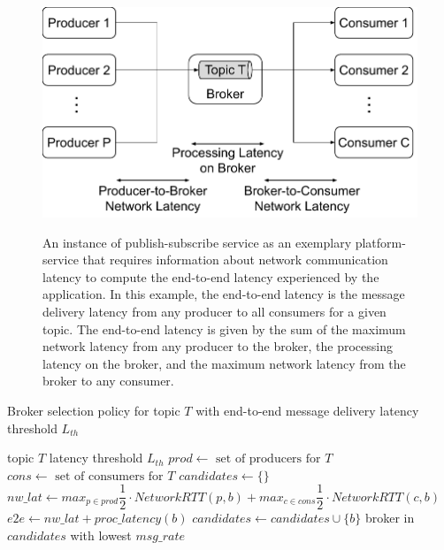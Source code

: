 \begin{figure}
\centering
\includegraphics[width=0.6\linewidth]{figures/mechanisms/nw_proximity/pubsub_e2e_latency.pdf}
\label{fig:nw_proximity_pubsub_e2e_latency}
\caption{An instance of publish-subscribe service as an exemplary platform-service that requires information about network communication latency to compute the end-to-end latency experienced by the application. In this example, the end-to-end latency is the message delivery latency from any producer to all consumers for a given topic. The end-to-end latency is given by the sum of the maximum network latency from any producer to the broker, the processing latency on the broker, and the maximum network latency from the broker to any consumer.}
\end{figure}

\begin{algorithm}
\caption{Broker selection policy for topic $T$ with end-to-end message delivery latency threshold $L_{th}$}
\label{algo:pubsub_nw_prox_example}
\begin{algorithmic}
\Require topic $T$
\Require latency threshold $L_{th}$
\State $prod \gets \text{ set of producers for }T$
\State $cons \gets \text{ set of consumers for }T$
\State $candidates \gets \{\}$
    \State $nw\_lat \gets max_{p \in prod} \dfrac{1}{2} \cdot NetworkRTT \left( p, b \right) + max_{c \in cons} \dfrac{1}{2} \cdot NetworkRTT \left( c, b \right)$
    \State $e2e \gets nw\_lat + proc\_latency \left( b \right)$
        \State $candidates \gets candidates \cup \{b\}$
    \EndIf
\EndFor
\Return broker in $candidates$ with lowest $msg\_rate$
\end{algorithmic}
\end{algorithm}

